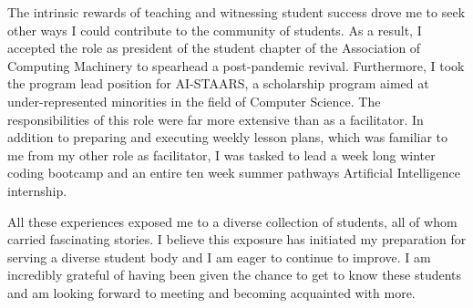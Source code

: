 \documentclass[12pt]{article}
\begin{document}
The intrinsic rewards of teaching and witnessing student success drove me to
seek other ways I could contribute to the community of students.  As a result, I
accepted the role as president of the student chapter of the Association of
Computing Machinery to spearhead a post-pandemic revival.  Furthermore, I took
the program lead position for AI-STAARS, a scholarship program aimed at under-represented
minorities in the field of Computer Science.  The responsibilities of this role
were far more extensive than as a facilitator. In addition to preparing and
executing weekly lesson plans, which was familiar to me from my other role as
facilitator, I was tasked to lead a week long winter coding bootcamp and an
entire ten week summer pathways Artificial Intelligence internship.

All these experiences exposed me to a diverse collection of students, all of
whom carried fascinating stories.  I believe this exposure has initiated my
preparation for serving a diverse student body and I am eager to continue to
improve.  I am incredibly grateful of having been given the chance to get to
know these students and am looking forward to meeting and becoming acquainted
with more.
\end{document}
